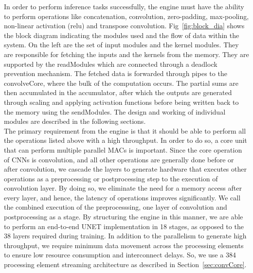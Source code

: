 \documentclass[a4paper,12pt, final]{report}
\begin{document}
In order to perform inference tasks successfully, the engine must have the ability to perform operations like concatenation, convolution, zero-padding, max-pooling, non-linear activation (relu) and transpose convolution. Fig~\ref{fig:block_dia} shows the block diagram indicating the modules used and the flow of data within the system. On the left are the set of input modules and the kernel modules. They are responsible for fetching the inputs and the kernels from the memory. They are supported by the readModules which are connected through a deadlock prevention mechanism. The fetched data is forwarded through pipes to the convolveCore, where the bulk of the computation occurs. The partial sums are then accumulated in the accumulator, after which the outputs are generated through scaling and applying activation functions before being written back to the memory using the sendModules. The design and working of individual modules are described in the following sections.
\\

The primary requirement from the engine is that it should be able to perform all the operations listed above with a high throughput. In order to do so, a core unit that can perform multiple parallel MACs is important. Since the core operation of CNNs is convolution, and all other operations are generally done before or after convolution, we cascade the layers to generate hardware that executes other operations as a preprocessing or postprocessing step to the execution of convolution layer. By doing so, we eliminate the need for a memory access after every layer, and hence, the latency of operations improves significantly. We call the combined execution of the preprocesssing, one layer of convolution and postprocessing as a stage. By structuring the engine in this manner, we are able to perform an end-to-end UNET implementation in 18 stages, as opposed to the 38 layers required during training. In addition to the parallelism to generate high throughput, we require minimum data movement across the processing elements to ensure low resource consumption and interconnect delays. So, we use a 384 processing element streaming architecture as described in Section~\ref{sec:convCore}.
\\
\end{document}
